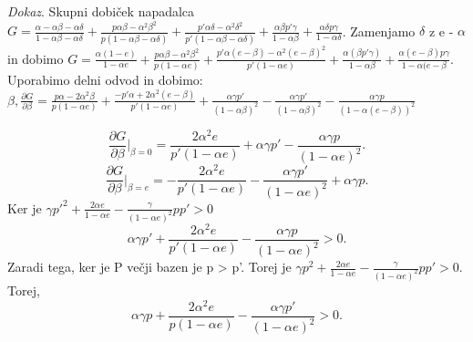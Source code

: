 \documentclass{acm_proc_article-sp}
\begin{document}
\textit{Dokaz}. Skupni dobiček napadalca $G = \frac{\alpha - \alpha\beta - \alpha\delta}{1 - \alpha\beta - \alpha\delta} + \frac{p \alpha\beta - \alpha^2\beta^2}{p(1 - \alpha\beta - \alpha\delta)} + \frac{p'\alpha\delta - \alpha^2\delta^2}{p'(1 - \alpha\beta - \alpha\delta)} + \frac{\alpha\beta p' \gamma}{1 - \alpha\beta} + \frac{\alpha\delta p \gamma}{1 - \alpha\delta}$. Zamenjamo $\delta$ z e - $\alpha$ in dobimo $G = \frac{\alpha(1 - e)}{1 - \alpha e} + \frac{p \alpha\beta - \alpha^2\beta^2}{p(1 - \alpha e)} + \frac{p' \alpha(e - \beta) - \alpha^2(e - \beta)^2}{p'(1 - \alpha e)} + \frac{\alpha(\beta p' \gamma)}{1 - \alpha\beta} + \frac{\alpha(e - \beta) p \gamma}{1 - \alpha(e - \beta}$. Uporabimo delni odvod in dobimo: $\beta, \frac{\partial G}{\partial \beta} = \frac{p\alpha - 2\alpha^2\beta}{p(1 - \alpha e)} + \frac{-p' \alpha + 2 \alpha^2(e - \beta)}{p' (1- \alpha e)} + \frac{\alpha\gamma p'}{(1 - \alpha\beta)^2} - \frac{\alpha\gamma p'}{(1 - \alpha\beta)^2} - \frac{\alpha\gamma p}{(1 - \alpha(e - \beta)) ^ 2}$

\begin{equation}
\frac{\partial G}{\partial \beta} |_{\beta=0} = \frac{2\alpha^2 e}{p' (1 - \alpha e)} + \alpha\gamma p' - \frac{\alpha\gamma p }{(1 - \alpha e)^2}.
\end{equation}
\begin{equation}
\frac{\partial G}{\partial \beta} |_{\beta=e} = -\frac{2\alpha^2 e}{p' (1 - \alpha e)}- \frac{\alpha\gamma p' }{(1 - \alpha e)^2} + \alpha\gamma p.
\end{equation}
Ker je $\gamma p'^2 + \frac{2\alpha e}{1 - \alpha e} - \frac{\gamma}{(1 - \alpha e) ^ 2} p p' > 0$
\begin{equation}
\alpha\gamma p' + \frac{2\alpha^2 e}{p'(1 - \alpha e)} - \frac{\alpha\gamma p}{(1 - \alpha e)^2} > 0.
\end{equation}
Zaradi tega, ker je P večji bazen je p > p'. Torej je $\gamma p^2 + \frac{2\alpha e}{1 - \alpha e} - \frac{\gamma}{(1 - \alpha e)^2} p p' > 0$. Torej,
\begin{equation}
\alpha\gamma p + \frac{2\alpha^2 e}{p(1 - \alpha e)} - \frac{\alpha\gamma p'}{(1- \alpha e)^2} > 0.
\end{equation}
\end{document}
